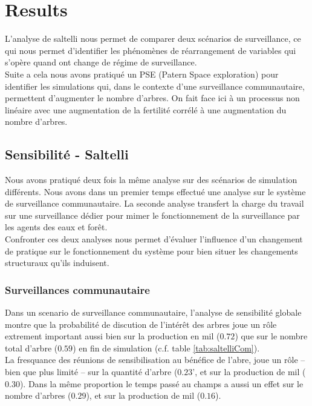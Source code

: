 \documentclass{article}
\begin{document}
\section{Results}

L'analyse de saltelli nous permet de comparer deux scénarios de surveillance, ce qui nous permet d'identifier les phénomènes de réarrangement de variables qui s'opère quand ont change de régime de surveillance.\\
    
Suite a cela nous avons pratiqué un PSE (Patern Space exploration) pour identifier les simulations qui, dans le contexte d'une surveillance communautaire, permettent d'augmenter le nombre d'arbres. On fait face ici à un processus non linéaire avec une augmentation de la fertilité corrélé à une augmentation du nombre d'arbres.

    \subsection{Sensibilité - Saltelli}

    Nous avons pratiqué deux fois la même analyse sur des scénarios de simulation différents. Nous avons dans un premier temps effectué une analyse sur le système de surveillance communautaire. La seconde analyse transfert la charge du travail sur une surveillance dédier pour mimer le fonctionnement de la surveillance par les agents des eaux et forêt.\\
    
    Confronter ces deux analyses nous permet d'évaluer l'influence d'un changement de pratique sur le fonctionnement du système pour bien situer les changements structuraux qu'ils induisent.

    \subsubsection{Surveillances communautaire}

        Dans un scenario de surveillance communautaire, l'analyse de sensibilité globale montre que la probabilité de discution de l'intérêt des arbres joue un rôle extrement important aussi bien sur la production en mil ($0.72$) que sur le nombre total d'arbre ($0.59$) en fin de simulation (c.f. table \ref{tab:saltelliCom}).\\

        La fresquance des réunions de sensibilisation au bénéfice de l'abre, joue un rôle -- bien que plus limité -- sur la quantité d'arbre ($0.23$', et sur la production de mil ($0.30$). Dans la même proportion le temps passé au champs a aussi un effet sur le nombre d'arbres ($0.29$), et sur la production de mil ($0.16$).\\
\end{document}
